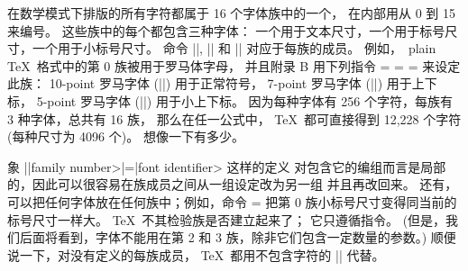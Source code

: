 \ninepoint
\ddanger 在数学模式下排版的所有字符都属于 16 个{字体族}中的一个，
在内部用从 0 到 15 来编号。%
这些族中的每个都包含三种字体：
一个用于文本尺寸，一个用于标号尺寸，一个用于小标号尺寸。%
命令 |\textfont|, |\scriptfont| 和 |\scriptscriptfont| 对应于每族的成员。%
例如，~plain \TeX\ 格式中的第 0 族被用于罗马体字母，
并且附录 B 用下列指令
\begintt
{}=\tenrm
{}=\sevenrm
{}=\fiverm
\endtt
来设定此族：
10-point 罗马字体 (|\tenrm|) 用于正常符号，
7-point 罗马字体 (|\sevenrm|) 用于上下标，
5-point 罗马字体 (|\fiverm|) 用于小上下标。%
因为每种字体有 256 个字符，每族有 3 种字体，总共有 16 族，
那么在任一公式中， \TeX\ 都可直接得到 12,228 个字符(每种尺寸为 4096 个)。%
想像一下有多少。

\ddanger 象 |\textfont|\<family number>|=|\<font identifier> 这样的定义%
对包含它的编组而言是局部的，因此可以很容易在族成员之间从一组设定改为另一组%
并且再改回来。%
还有，可以把任何字体放在任何族中；例如，命令
\begintt
{}=
\endtt
把第 0 族小标号尺寸变得同当前的标号尺寸一样大。%
 \TeX\ 不其检验族是否建立起来了；
它只遵循指令。%
(但是，我们后面将看到，字体不能用在第 2 和 3 族，除非它们包含一定数量的参数。)
顺便说一下，对没有定义的每族成员， \TeX\ 都用不包含字符的 |\nullfont| 代替。

